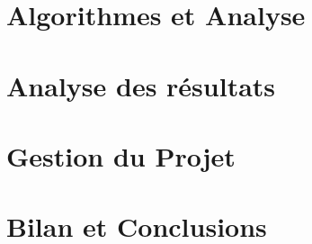 \documentclass[a4paper]{article} %
\begin{document}





\section{Algorithmes et Analyse}






\section{Analyse des résultats}






\section{Gestion du Projet}




\section{Bilan et Conclusions}
\end{document}
